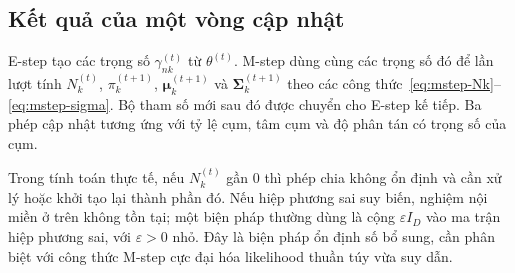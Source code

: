 \subsection{Kết quả của một vòng cập nhật}
E-step tạo các trọng số $\gamma_{nk}^{(t)}$ từ $\theta^{(t)}$. M-step dùng cùng các trọng số đó để lần lượt tính $N_k^{(t)}$, $\pi_k^{(t+1)}$, $\boldsymbol{\mu}_k^{(t+1)}$ và $\boldsymbol{\Sigma}_k^{(t+1)}$ theo các công thức~\eqref{eq:mstep-Nk}--\eqref{eq:mstep-sigma}. Bộ tham số mới sau đó được chuyển cho E-step kế tiếp. Ba phép cập nhật tương ứng với tỷ lệ cụm, tâm cụm và độ phân tán có trọng số của cụm.

Trong tính toán thực tế, nếu $N_k^{(t)}$ gần $0$ thì phép chia không ổn định và cần xử lý hoặc khởi tạo lại thành phần đó. Nếu hiệp phương sai suy biến, nghiệm nội miền ở trên không tồn tại; một biện pháp thường dùng là cộng $\varepsilon I_D$ vào ma trận hiệp phương sai, với $\varepsilon>0$ nhỏ. Đây là biện pháp ổn định số bổ sung, cần phân biệt với công thức M-step cực đại hóa likelihood thuần túy vừa suy dẫn.
